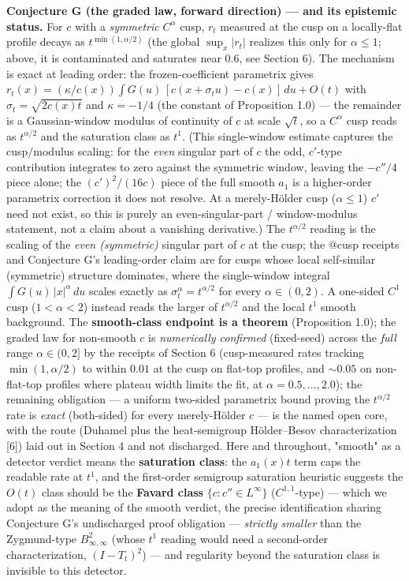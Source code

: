 \documentclass[11pt]{article}
\begin{document}
\textbf{Conjecture G (the graded law, forward direction) — and its epistemic status.}  For $c$ with a \emph{symmetric} $C^\alpha$ cusp, $r_t$ measured at the cusp on a locally-flat profile decays as $t^{\min(1, \alpha/2)}$ (the global $\sup_x|r_t|$ realizes this only for $\alpha \le 1$; above, it is contaminated and saturates near $0.6$, see Section 6).  The mechanism is exact at leading order: the frozen-coefficient parametrix gives $r_t(x) = (\kappa/c(x))\int G(u)\,[c(x + \sigma_t u) - c(x)]\,du + O(t)$ with $\sigma_t = \sqrt{2c(x)t}$ and $\kappa = -1/4$ (the constant of Proposition 1.0) — the remainder is a Gaussian-window modulus of continuity of $c$ at scale $\sqrt t$, so a $C^\alpha$ cusp reads as $t^{\alpha/2}$ and the saturation class as $t^1$.  (This single-window estimate captures the cusp/modulus scaling: for the \emph{even} singular part of $c$ the odd, $c'$-type contribution integrates to zero against the symmetric window, leaving the $-c''/4$ piece alone; the $(c')^2/(16c)$ piece of the full smooth $a_1$ is a higher-order parametrix correction it does not resolve.  At a merely-Hölder cusp ($\alpha \le 1$) $c'$ need not exist, so this is purely an even-singular-part / window-modulus statement, not a claim about a vanishing derivative.)  The $t^{\alpha/2}$ reading is the scaling of the \emph{even (symmetric)} singular part of $c$ at the cusp; the @cusp receipts and Conjecture G's leading-order claim are for cusps whose local self-similar (symmetric) structure dominates, where the single-window integral $\int G(u)\,|x|^\alpha\,du$ scales exactly as $\sigma_t^\alpha = t^{\alpha/2}$ for every $\alpha \in (0,2)$.  A one-sided $C^1$ cusp ($1 < \alpha < 2$) instead reads the larger of $t^{\alpha/2}$ and the local $t^1$ smooth background.  The \textbf{smooth-class endpoint is a theorem} (Proposition 1.0); the graded law for non-smooth $c$ is \emph{numerically confirmed} (fixed-seed) across the \emph{full} range $\alpha \in (0,2]$ by the receipts of Section 6 (cusp-measured rates tracking $\min(1,\alpha/2)$ to within $0.01$ at the cusp on flat-top profiles, and $\sim 0.05$ on non-flat-top profiles where plateau width limits the fit, at $\alpha = 0.5, \dots, 2.0$); the remaining obligation — a uniform two-sided parametrix bound proving the $t^{\alpha/2}$ rate is \emph{exact} (both-sided) for every merely-Hölder $c$ — is the named open core, with the route (Duhamel plus the heat-semigroup Hölder–Besov characterization [6]) laid out in Section 4 and not discharged.  Here and throughout, "smooth" as a detector verdict means the \textbf{saturation class}: the $a_1(x)t$ term caps the readable rate at $t^1$, and the first-order semigroup saturation heuristic suggests the $O(t)$ class should be the \textbf{Favard class} $\{c : c'' \in L^\infty\}$ ($C^{1,1}$-type) — which we adopt as the meaning of the smooth verdict, the precise identification sharing Conjecture G's undischarged proof obligation — \emph{strictly smaller} than the Zygmund-type $B^2_{\infty,\infty}$ (whose $t^1$ reading would need a second-order characterization, $(I - T_t)^2$) — and regularity beyond the saturation class is invisible to this detector.
\end{document}
